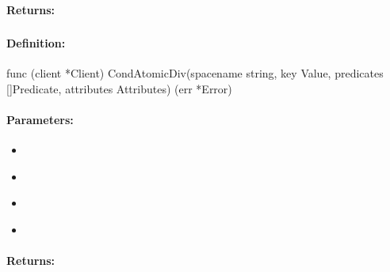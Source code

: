 \paragraph{Returns:}


\pagebreak
\subsubsection{}
\label{api:Go:CondAtomicDiv}


\paragraph{Definition:}
\begin{gocode}
func (client *Client) CondAtomicDiv(spacename string, key Value, predicates []Predicate, attributes Attributes) (err *Error)
\end{gocode}

\paragraph{Parameters:}
\begin{itemize}[noitemsep]
\item {}\\

\item {}\\

\item {}\\

\item {}\\

\end{itemize}

\paragraph{Returns:}


\pagebreak
\subsubsection{}
\label{api:Go:GroupAtomicDiv}


